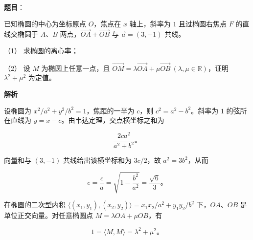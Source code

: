 \begin{answer}

\textbf{题目}：

已知椭圆的中心为坐标原点 $O$，焦点在 $x$ 轴上，斜率为 $1$ 且过椭圆右焦点 $F$ 的直线交椭圆于 $A\text{、}B$ 两点，$\overrightarrow{OA}+\overrightarrow{OB}$ 与 $\vec a=(3,-1)$ 共线。

（1） 求椭圆的离心率；

（2） 设 $M$ 为椭圆上任意一点，且 $\overrightarrow{OM}=\lambda\overrightarrow{OA}+\mu\overrightarrow{OB}\ (\lambda,\mu\in\mathbb R)$，证明 $\lambda^2+\mu^2$ 为定值。

\textbf{解析}


设椭圆为 $x^2/a^2+y^2/b^2=1$，焦距的一半为 $c$，则 $c^2=a^2-b^2$。斜率为 $1$ 的弦所在直线为 $y=x-c$。由韦达定理，交点横坐标之和为

\nopagebreak[4]
\[
\frac{2ca^2}{a^2+b^2}\text{。}
\]

向量和与 $(3,-1)$ 共线给出该横坐标和为 $3c/2$，故 $a^2=3b^2$，从而

\nopagebreak[4]
\[
e=\frac ca=\sqrt{1-\frac{b^2}{a^2}}=\frac{\sqrt6}{3}\text{。}
\]


在椭圆的二次型内积 $\langle (x_1,y_1),(x_2,y_2)\rangle=x_1x_2/a^2+y_1y_2/b^2$ 下，$OA\text{、}OB$ 是单位正交向量。对任意椭圆点 $M=\lambda OA+\mu OB$，有

\nopagebreak[4]
\[
1=\langle M,M\rangle=\lambda^2+\mu^2\text{。}
\]



\end{answer}
